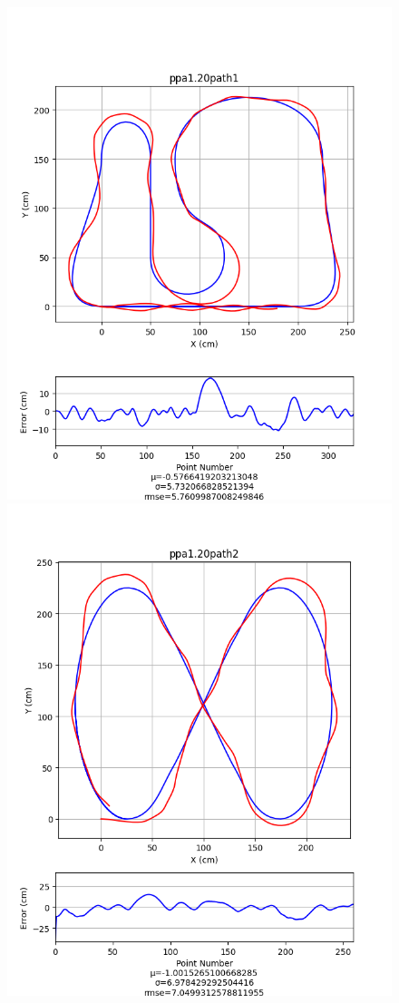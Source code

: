 \documentclass[mla7]{mla}
\begin{document}
\begin{paper}
\begin{figure}[H]
\includegraphics[width=\linewidth]{pathData/ppa1path1}
\endminipage\hfill
{}
\includegraphics[width=\linewidth]{pathData/ppa1path2}

\end{figure}
\end{paper}
\end{document}
